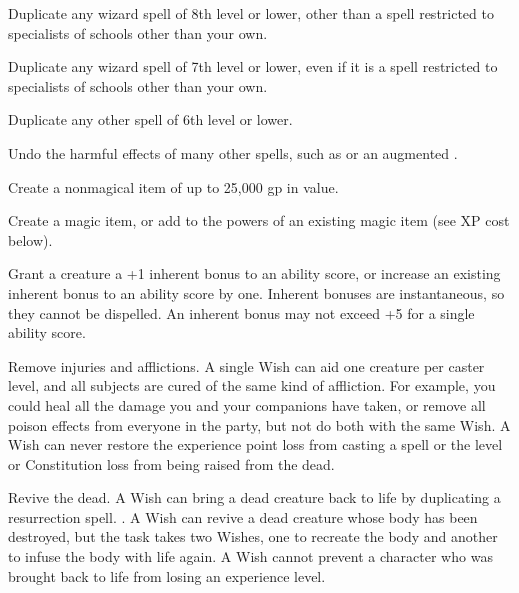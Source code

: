 \begin{list}{}{\leftmargin=1em}
  \item Duplicate any wizard spell of 8th level or lower, other than a spell restricted to specialists of schools other than your own.
  \item Duplicate any wizard spell of 7th level or lower, even if it is a spell restricted to specialists of schools other than your own.
  \item Duplicate any other spell of 6th level or lower.
  \item Undo the harmful effects of many other spells, such as  or an augmented .
  \item Create a nonmagical item of up to 25,000 gp in value.
  \item Create a magic item, or add to the powers of an existing magic item (see XP cost below).
  \item Grant a creature a +1 inherent bonus to an ability score, or increase an existing inherent bonus to an ability score by one.
  Inherent bonuses are instantaneous, so they cannot be dispelled. An inherent bonus may not exceed +5 for a single ability score.
  \item Remove injuries and afflictions. A single Wish can aid one creature per caster level, and all subjects are cured of the same kind of affliction. 
  For example, you could heal all the damage you and your companions have taken, or remove all poison effects from everyone in the party, but not do both with the same Wish. 
  A Wish can never restore the experience point loss from casting a spell or the level or Constitution loss from being raised from the dead.
  \item Revive the dead. A Wish can bring a dead creature back to life by duplicating a resurrection spell. .
  A Wish can revive a dead creature whose body has been destroyed, but the task takes two Wishes, one to recreate the body and another to infuse the body with life again. 
  A Wish cannot prevent a character who was brought back to life from losing an experience level.

\end{list}
